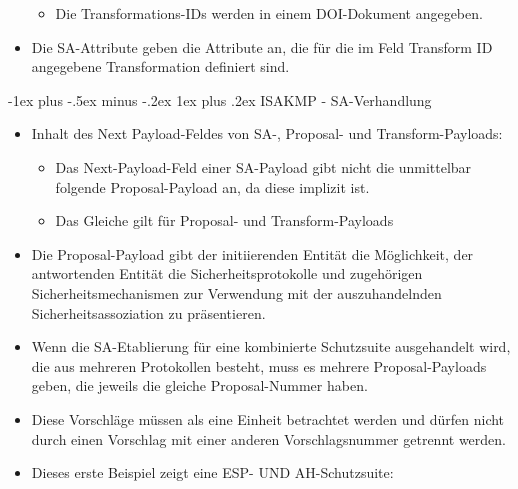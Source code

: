 \documentclass[a4paper]{article}
\makeatletter
\renewcommand{\subsubsection}{\@startsection{subsubsection}{3}{0mm}%
 {-1ex plus -.5ex minus -.2ex}%
 {1ex plus .2ex}%
 {\normalfont\small\bfseries}}
\makeatother
\begin{document}
\begin{multicols}{3}
\begin{itemize}
              \begin{itemize}
                  \item
                        Die Transformations-IDs werden in einem DOI-Dokument angegeben.
              \end{itemize}
        \item
              Die SA-Attribute geben die Attribute an, die für die im Feld Transform
              ID angegebene Transformation definiert sind.
    \end{itemize}


    \subsubsection{ISAKMP - SA-Verhandlung}

    \begin{itemize}
        \item
              Inhalt des Next Payload-Feldes von SA-, Proposal- und
              Transform-Payloads:

              \begin{itemize}
                  \item
                        Das Next-Payload-Feld einer SA-Payload gibt nicht die unmittelbar
                        folgende Proposal-Payload an, da diese implizit ist.
                  \item
                        Das Gleiche gilt für Proposal- und Transform-Payloads
              \end{itemize}
        \item
              Die Proposal-Payload gibt der initiierenden Entität die Möglichkeit,
              der antwortenden Entität die Sicherheitsprotokolle und zugehörigen
              Sicherheitsmechanismen zur Verwendung mit der auszuhandelnden
              Sicherheitsassoziation zu präsentieren.
        \item
              Wenn die SA-Etablierung für eine kombinierte Schutzsuite ausgehandelt
              wird, die aus mehreren Protokollen besteht, muss es mehrere
              Proposal-Payloads geben, die jeweils die gleiche Proposal-Nummer
              haben.
        \item
              Diese Vorschläge müssen als eine Einheit betrachtet werden und dürfen
              nicht durch einen Vorschlag mit einer anderen Vorschlagsnummer
              getrennt werden.
        \item
              Dieses erste Beispiel zeigt eine ESP- UND AH-Schutzsuite:


\end{itemize}
\end{multicols}
\end{document}
